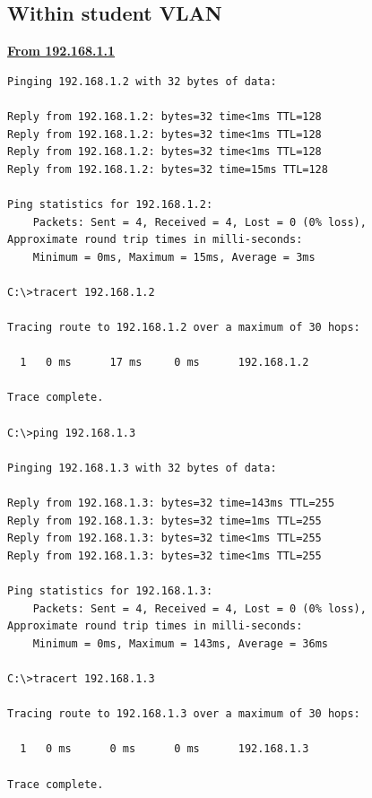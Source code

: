 \documentclass{article}
\begin{document}
\subsection{Within student VLAN}
\textbf{\underline{From 192.168.1.1}}\\
\begin{lstlisting}[language=CISCO]
Pinging 192.168.1.2 with 32 bytes of data:

Reply from 192.168.1.2: bytes=32 time<1ms TTL=128
Reply from 192.168.1.2: bytes=32 time<1ms TTL=128
Reply from 192.168.1.2: bytes=32 time<1ms TTL=128
Reply from 192.168.1.2: bytes=32 time=15ms TTL=128

Ping statistics for 192.168.1.2:
    Packets: Sent = 4, Received = 4, Lost = 0 (0% loss),
Approximate round trip times in milli-seconds:
    Minimum = 0ms, Maximum = 15ms, Average = 3ms

C:\>tracert 192.168.1.2

Tracing route to 192.168.1.2 over a maximum of 30 hops: 

  1   0 ms      17 ms     0 ms      192.168.1.2

Trace complete.

C:\>ping 192.168.1.3

Pinging 192.168.1.3 with 32 bytes of data:

Reply from 192.168.1.3: bytes=32 time=143ms TTL=255
Reply from 192.168.1.3: bytes=32 time=1ms TTL=255
Reply from 192.168.1.3: bytes=32 time<1ms TTL=255
Reply from 192.168.1.3: bytes=32 time<1ms TTL=255

Ping statistics for 192.168.1.3:
    Packets: Sent = 4, Received = 4, Lost = 0 (0% loss),
Approximate round trip times in milli-seconds:
    Minimum = 0ms, Maximum = 143ms, Average = 36ms

C:\>tracert 192.168.1.3

Tracing route to 192.168.1.3 over a maximum of 30 hops: 

  1   0 ms      0 ms      0 ms      192.168.1.3

Trace complete.
\end{lstlisting}
\end{document}
